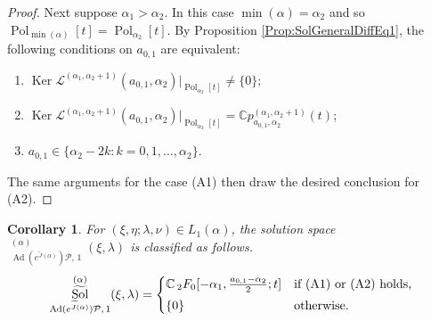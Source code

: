 \documentclass[a4paper,11pt,reqno]{amsart}
\newcommand{\CC}{\mathbb{C}}
\newcommand{\calL}{\mathcal{L}}
\newcommand{\calP}{\mathcal{P}}
\newcommand{\0}{{\bf 0}}
\newcommand{\1}{{\bf 1}}
\DeclareMathOperator{\Ad}{Ad}
\DeclareMathOperator{\Pol}{Pol}
\DeclareMathOperator{\Sol}{Sol}
\newcommand{\wJ}{\widetilde{J}}
\DeclareMathOperator{\wSol}{\widetilde{\Sol}}
\DeclareMathOperator{\Ker}{Ker}
\theoremstyle{plain}
\newtheorem{corollary}[equation]{Corollary}
\theoremstyle{definition}
\numberwithin{equation}{section}
\theoremstyle{definition}
\begin{document}
\begin{proof}
Next suppose $\alpha_1 > \alpha_2$.
In this case 
$\min(\alpha) = \alpha_2$ and so $\Pol_{\min(\alpha)}[t]= \Pol_{\alpha_2}[t]$.
By Proposition \ref{Prop:SolGeneralDiffEq1}, the following conditions on 
$a_{0,1}$ are equivalent:
\vspace{3pt}
\begin{enumerate}[label=\normalfont{(\roman*)}]
\item $\Ker\calL^{(\alpha_1,\alpha_2+1)}(a_{0,1},\alpha_2)\big \vert_{\Pol_{\alpha_2}[t]}
\neq \{0\}$;
\vspace{2pt}
\item $\Ker\calL^{(\alpha_1,\alpha_2+1)}(a_{0,1},\alpha_2)\big \vert_{\Pol_{\alpha_2}[t]}=\CC p^{(\alpha_1,\alpha_2+1)}_{a_{0,1},\alpha_2}(t)$;
\vspace{3pt}
\item $a_{0,1} \in \{\alpha_2-2k : k=0,1,\ldots, \alpha_2\}$.
\vspace{3pt}
\end{enumerate}
The same arguments for the case (A1) then draw the desired conclusion for (A2).
\end{proof}

\begin{corollary}\label{cor:Sol2F0}
For $(\xi, \eta; \lambda, \nu) \in L_1(\alpha)$,
the solution space
$\wSol_{\Ad(e^{\wJ(\alpha)}) \calP,\, 1}^{(\alpha)}(\xi,\lambda)$
is classified as follows.
\begin{equation*}
\wSol_{\Ad(e^{\wJ(\alpha)}) \calP,\, 1}^{(\alpha)}(\xi,\lambda)
=
\begin{cases}
\CC\, 
{}_2F_0[-\alpha_1,\tfrac{a_{0,1}-\alpha_2}{2};t]
& 
\textnormal{if (A1) or (A2) holds,}\\[3pt]
\{0\} & \textnormal{otherwise.}
\end{cases}
\end{equation*}
\end{corollary}
\end{document}
